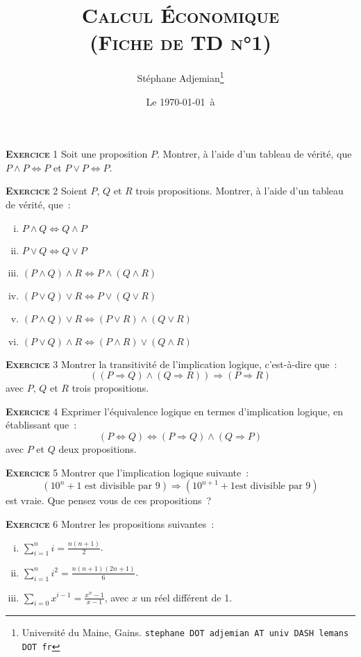 \documentclass[10pt,a4paper,notitlepage]{article}
\newcommand{\exercice}[1]{\textsc{\textbf{Exercice}} #1}
\begin{document}
\title{\textsc{Calcul Économique\\ \small{(Fiche de TD n°1)}}}
\author{Stéphane Adjemian\thanks{Université du Maine, Gains. \texttt{stephane DOT adjemian AT univ DASH lemans DOT fr}}}
\date{Le \today\ à \thistime}

\maketitle

\exercice{1} Soit une proposition $P$. Montrer, à l'aide d'un tableau
de vérité, que $P \land P \Leftrightarrow P$ et $P \lor P
\Leftrightarrow P$.

\bigskip

\exercice{2} Soient $P$, $Q$ et $R$ trois propositions. Montrer, à l'aide d'un tableau
de vérité, que :
\begin{enumerate}[(i)]
\item $P \land Q \Leftrightarrow Q \land P$
\item $P \lor Q \Leftrightarrow Q \lor P$
\item $(P \land Q) \land R \Leftrightarrow P \land (Q \land R)$
\item $(P \lor Q) \lor R \Leftrightarrow P \lor (Q \lor R)$
\item $(P \land Q) \lor R \Leftrightarrow (P \lor R) \land (Q \lor R)$
\item $(P \lor Q) \land R \Leftrightarrow (P \land R) \lor (Q \land R)$
\end{enumerate}

\bigskip

\exercice{3} Montrer la transitivité de l'implication logique, c'est-à-dire
que :
\[
((P \Rightarrow Q) \land (Q \Rightarrow R)) \Rightarrow (P \Rightarrow R)
\]
avec $P$, $Q$ et $R$ trois propositions.

\bigskip

\exercice{4} Exprimer l'équivalence logique en termes d'implication logique, en
établissant que :
\[
(P \Leftrightarrow Q) \Leftrightarrow (P \Rightarrow Q) \land (Q
\Rightarrow P)
\]
avec $P$ et $Q$ deux propositions.

\bigskip

\exercice{5} Montrer que l'implication logique suivante :
\[
(10^n+1 \text{ est divisible par } 9) \Rightarrow (10^{n+1}+1 \text{
  est divisible par 9})
\]
est vraie. Que pensez vous de ces propositions ?

\bigskip

\exercice{6} Montrer les propositions suivantes :
\begin{enumerate}[(i)]
\item $\sum_{i=1}^n i = \frac{n(n+1)}{2}$.
\item $\sum_{i=1}^n i^2 = \frac{n(n+1)(2n+1)}{6}$.
\item $\sum_{i=0}x^{i-1} = \frac{x^{n}-1}{x-1}$, avec $x$ un réel différent de 1.
\end{enumerate}
\end{document}
